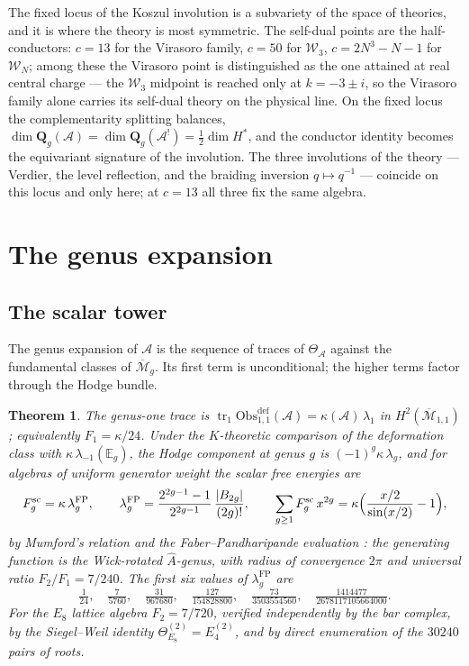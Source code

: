 \documentclass[11pt]{amsart}
\numberwithin{equation}{section}
\theoremstyle{plain}
\newtheorem{theorem}{Theorem}[section]
\theoremstyle{definition}
\theoremstyle{remark}
\newcommand{\cA}{\mathcal{A}}
\newcommand{\cM}{\mathcal{M}}
\newcommand{\cW}{\mathcal{W}}
\newcommand{\bE}{\mathbb{E}}
\newcommand{\Mbar}{\overline{\cM}}
\newcommand{\Ob}{\mathrm{Obs}}
\begin{document}
The fixed locus of the Koszul involution is a subvariety of the space
of theories, and it is where the theory is most symmetric. The
self-dual points are the half-conductors: $c=13$ for the Virasoro
family, $c=50$ for $\cW_3$, $c=2N^{3}-N-1$ for $\cW_N$; among these
the Virasoro point is distinguished as the one attained at real
central charge --- the $\cW_3$ midpoint is reached only at
$k=-3\pm i$, so the Virasoro family alone carries its self-dual
theory on the physical line. On the fixed locus the complementarity
splitting balances, $\dim\mathbf{Q}_g(\cA)=\dim\mathbf{Q}_g(\cA^{!})
=\tfrac12\dim H^{*}$, and the conductor identity becomes the
equivariant signature of the involution. The three involutions of the
theory --- Verdier, the level reflection, and the braiding inversion
$q\mapsto q^{-1}$ --- coincide on this locus and only here; at
$c=13$ all three fix the same algebra.

\section{The genus expansion}\label{sec:genus-expansion}

\subsection{The scalar tower}

The genus expansion of $\cA$ is the sequence of traces of
$\Theta_{\cA}$ against the fundamental classes of $\Mbar_g$. Its first
term is unconditional; the higher terms factor through the Hodge bundle.

\begin{theorem}\label{thm:genus-expansion}
The genus-one trace is
$\operatorname{tr}_1\Ob^{\mathrm{def}}_{1,1}(\cA)=\kappa(\cA)\,\lambda_1$
in $H^{2}(\Mbar_{1,1})$; equivalently $F_1=\kappa/24$. Under the
$K$-theoretic comparison of the deformation class with
$\kappa\,\lambda_{-1}(\bE_g)$, the Hodge component at genus $g$ is
$(-1)^{g}\kappa\,\lambda_g$, and for algebras of uniform generator
weight the scalar free energies are
\begin{equation}\label{eq:Ahat}
F^{\mathrm{sc}}_g=\kappa\,\lambda_g^{\mathrm{FP}},
\qquad
\lambda_g^{\mathrm{FP}}
=\frac{2^{2g-1}-1}{2^{2g-1}}\,\frac{|B_{2g}|}{(2g)!},
\qquad
\sum_{g\geq1}F^{\mathrm{sc}}_g\,x^{2g}
=\kappa\Bigl(\frac{x/2}{\sin(x/2)}-1\Bigr),
\end{equation}
by Mumford's relation and the Faber--Pandharipande evaluation
\cite{Mum,FP}: the generating function is the Wick-rotated
$\widehat{A}$-genus, with radius of convergence $2\pi$ and universal
ratio $F_2/F_1=7/240$. The first six values of
$\lambda_g^{\mathrm{FP}}$ are
\[
\tfrac{1}{24},\quad
\tfrac{7}{5760},\quad
\tfrac{31}{967680},\quad
\tfrac{127}{154828800},\quad
\tfrac{73}{3503554560},\quad
\tfrac{1414477}{2678117105664000}.
\] For the $E_8$ lattice algebra
$F_2=7/720$, verified independently by the bar complex, by the
Siegel--Weil identity $\Theta^{(2)}_{E_8}=E_4^{(2)}$, and by direct
enumeration of the $30240$ pairs of roots.
\end{theorem}
\end{document}

